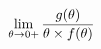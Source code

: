 \documentclass[preview]{standalone}
\begin{document}
\begin{align*}
\lim_{\theta \to 0 +} {g( \theta ) \over {\theta \times f( \theta )}}
\end{align*}
\end{document}
